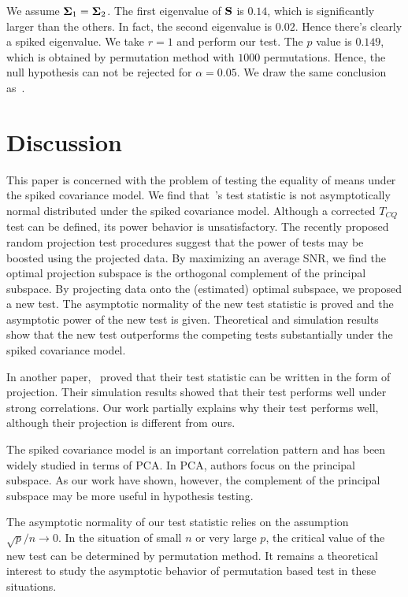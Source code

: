 \documentclass[3p]{elsarticle}
\theoremstyle{plain}
\theoremstyle{definition}
\theoremstyle{remark}
\begin{document}
We assume $\boldsymbol{\Sigma}_1=\boldsymbol{\Sigma}_2$.
The first eigenvalue of $\mathbf{S}$ is $0.14$, which is significantly larger than the others.
In fact, the second eigenvalue is $0.02$.
Hence there's clearly a spiked eigenvalue.
We take $r=1$ and perform our test.
The $p$ value is $0.149$, which is obtained by permutation method with $1000$ permutations.
Hence, the null hypothesis can not be rejected for $\alpha=0.05$.
We draw the same conclusion as~\cite{Ma2015A}.

\section{Discussion}



This paper is concerned with the problem of testing the equality of means under the spiked covariance model.
We find that~\cite{Chen2010A}'s test statistic is not asymptotically normal distributed under the spiked covariance model. 
Although a corrected $T_{CQ}$ test can be defined, its power behavior is unsatisfactory.
The recently proposed random projection test procedures suggest that the power of tests may be boosted using the projected data.
By maximizing an average SNR, we find the optimal projection subspace is the orthogonal complement of the principal subspace.
By projecting data onto the (estimated) optimal subspace, we proposed a new test.
The asymptotic normality of the new test statistic is proved and the asymptotic power of the new test is given.
    Theoretical and simulation results show that the new test outperforms the competing tests substantially under the spiked covariance model.


In another paper,~\cite{Zhao2016A} proved that their test statistic can be written in the form of projection. Their simulation results showed that their test performs well under strong correlations.
Our work partially explains why their test performs well, although their projection is different from ours. 

 The spiked covariance model is an important correlation pattern and has been widely studied in terms of PCA\@.
 In PCA, authors focus on the principal subspace.
 As our work have shown, however, the complement of the principal subspace may be more useful in hypothesis testing. 


The asymptotic normality of our test statistic relies on the assumption $\sqrt{p}/n\to 0$. In the situation of small $n$ or very large $p$, the critical value of the new test can be determined by permutation method. It remains a theoretical interest to study the asymptotic behavior of permutation based test in these situations.
\end{document}
